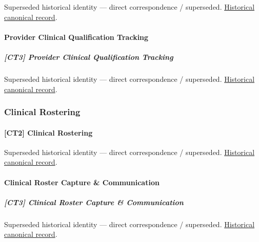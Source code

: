\par\label{element:cee76a930a4e4e7d9c49357ba290c8bf}
Superseded historical identity — direct correspondence / superseded. \href{../../../../continuum/strategy/capability/cee76a930a4e4e7d9c49357ba290c8bf.md}{Historical canonical record}.\par

\paragraph{Provider Clinical Qualification Tracking}

\subparagraph{[CT3] Provider Clinical Qualification Tracking}

\par\label{element:ab0415e2ea0a4da4ad3dc46997d48bc3}
Superseded historical identity — direct correspondence / superseded. \href{../../../../continuum/strategy/capability/ab0415e2ea0a4da4ad3dc46997d48bc3.md}{Historical canonical record}.\par

\subsubsection{Clinical Rostering}

\paragraph{[CT2] Clinical Rostering}

\par\label{element:b6527516a69c499d8cc9c8fe881169fe}
Superseded historical identity — direct correspondence / superseded. \href{../../../../continuum/strategy/capability/b6527516a69c499d8cc9c8fe881169fe.md}{Historical canonical record}.\par

\paragraph{Clinical Roster Capture \& Communication}

\subparagraph{[CT3] Clinical Roster Capture \& Communication}

\par\label{element:2054d57bb33a4361b3ef0824545a1784}
Superseded historical identity — direct correspondence / superseded. \href{../../../../continuum/strategy/capability/2054d57bb33a4361b3ef0824545a1784.md}{Historical canonical record}.\par

